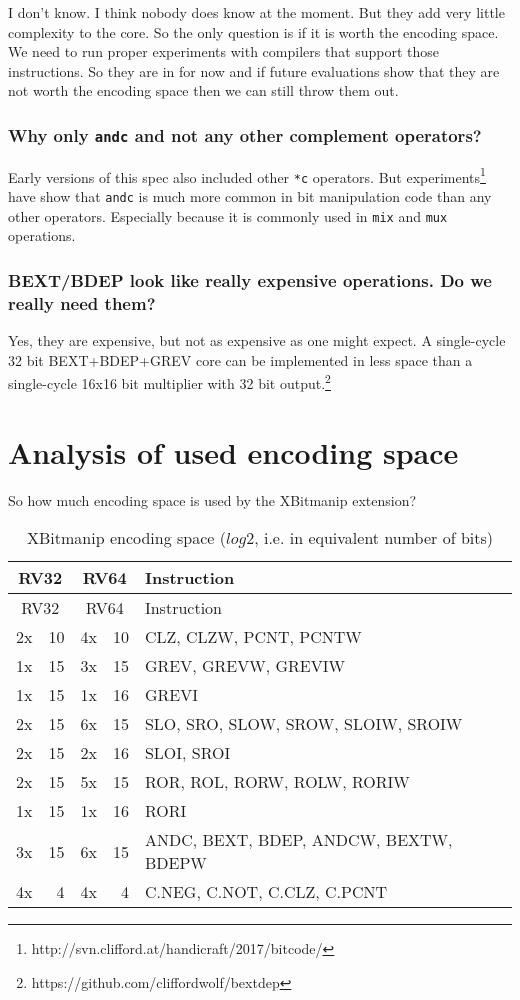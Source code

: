 I don't know. I think nobody does know at the moment. But they add very little
complexity to the core. So the only question is if it is worth the encoding
space. We need to run proper experiments with compilers that support those
instructions. So they are in for now and if future evaluations show that they
are not worth the encoding space then we can still throw them out.

\subsubsection{Why only \texttt{andc} and not any other complement operators?}

Early versions of this spec also included other \texttt{*c} operators. But
experiments\footnote{http://svn.clifford.at/handicraft/2017/bitcode/} have show that
\texttt{andc} is much more common in bit manipulation code than any other operators.
Especially because it is commonly used in \texttt{mix} and \texttt{mux} operations.

\subsubsection{BEXT/BDEP look like really expensive operations. Do we really need them?}

Yes, they are expensive, but not as expensive as one might expect. A
single-cycle 32 bit BEXT+BDEP+GREV core can be implemented in less space than a
single-cycle 16x16 bit multiplier with 32 bit output.\footnote{https://github.com/cliffordwolf/bextdep}

\section{Analysis of used encoding space}

So how much encoding space is used by the XBitmanip extension?

\begin{longtable}[c]{@{}rr|rr|l@{}}
\caption{XBitmanip encoding space ($log2$, i.e. in equivalent number of bits)}\tabularnewline
\toprule
\multicolumn{2}{c}{RV32} & \multicolumn{2}{c}{RV64} & Instruction\tabularnewline
\midrule
\endfirsthead
\toprule
\multicolumn{2}{c}{RV32} & \multicolumn{2}{c}{RV64} & Instruction\tabularnewline
\midrule
\endhead
2x & 10 & 4x & 10 & CLZ, CLZW, PCNT, PCNTW\tabularnewline
\midrule
1x & 15 & 3x & 15 & GREV, GREVW, GREVIW\tabularnewline
1x & 15 & 1x & 16 & GREVI\tabularnewline
\midrule
2x & 15 & 6x & 15 & SLO, SRO, SLOW, SROW, SLOIW, SROIW\tabularnewline
2x & 15 & 2x & 16 & SLOI, SROI\tabularnewline
\midrule
2x & 15 & 5x & 15 & ROR, ROL, RORW, ROLW, RORIW\tabularnewline
1x & 15 & 1x & 16 & RORI\tabularnewline
\midrule
3x & 15 & 6x & 15 & ANDC, BEXT, BDEP, ANDCW, BEXTW, BDEPW\tabularnewline
\midrule
4x &  4 & 4x &  4 & C.NEG, C.NOT, C.CLZ, C.PCNT\tabularnewline
\bottomrule
\end{longtable}

